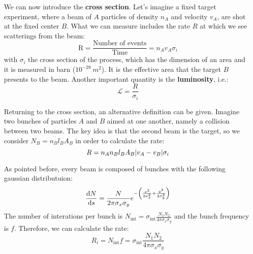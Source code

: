 \documentclass[../../main/main.tex]{subfiles}
\begin{document}
We can now introduce the \textbf{cross section}. Let's imagine a fixed target experiment, where a beam of \( A \) particles of density \( n_A \) and velocity \( v_A \), are shot at the fixed center \( B \). What we can measure includes the rate \( R \) at which we see scatterings from the beam:
\begin{equation}
    \text{R}
    =
    \frac{\text{Number of events}}{\text{Time}}
    =
    n_A v_A \sigma_i
    \label{eq:L03_R1B}
\end{equation}
with \( \sigma_i \) the cross section of the process, which has the dimension of an area and it is measured in barn (\(10^{-28} \ \si{m^2} \)). It is the effective area that the target \( B \) presents to the beam. Another important quantity is the \textbf{luminosity}, i.e.:
\begin{equation}
    \mathcal{L} = \frac{R}{\sigma_i}
    \label{eq:L03_L}
\end{equation}

Returning to the cross section, an alternative definition can be given. Imagine two bunches of particles \( A \) and \( B \) aimed at one another, namely a collision between two beams. The key idea is that the second beam is the target, so we consider \( N_B = n_B l_B A_B \) in order to calculate the rate:
\begin{equation}
    R = n_A n_B l_B A_B \abs{v_A - v_B} \sigma_i
    \label{eq:L03_R2B}
\end{equation}

As pointed before, every beam is composed of bunches with the following gaussian distributuion:
\begin{equation}
    \dv{N}{s} = \frac{N}{2\pi \sigma_x \sigma_y} e^{-\qty(\frac{x^2}{2 \sigma_x^2} + \frac{y^2}{2 \sigma_y^2}) }
    \label{eq:L03_BGD}
\end{equation}
The number of interations per bunch is \( N_\mathrm{int} = \sigma_\mathrm{int} \frac{N_1 N_2}{4\pi \sigma_x \sigma_y} \) and the bunch frequency is \( f \). Therefore, we can calculate the rate:
\begin{equation}
    R_i = N_\mathrm{int} f = \sigma_\mathrm{int} \frac{N_1 N_2}{4\pi \sigma_x \sigma_y}
    \label{eq:L03_RB}
\end{equation}
\end{document}
